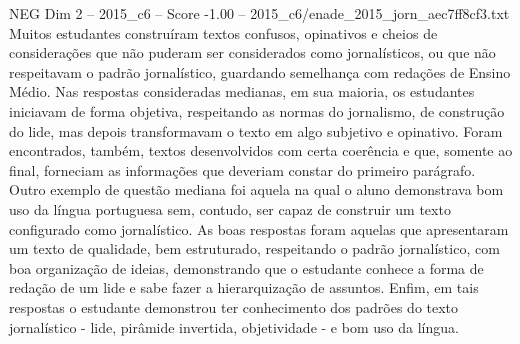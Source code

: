 \begin{textsample}{NEG Dim 2 – 2015\_c6 – Score -1.00 – 2015\_c6/enade\_2015\_jorn\_aec7ff8cf3.txt}
Muitos estudantes construíram textos confusos, opinativos e cheios de considerações que não puderam ser considerados como jornalísticos, ou que não respeitavam o padrão jornalístico, guardando semelhança com redações de Ensino Médio.
Nas respostas consideradas medianas, em sua maioria, os estudantes iniciavam de forma objetiva, respeitando as normas do jornalismo, de construção do lide, mas depois transformavam o texto em algo subjetivo e opinativo.
Foram encontrados, também, textos desenvolvidos com certa coerência e que, somente ao final, forneciam as informações que deveriam constar do primeiro parágrafo.
Outro exemplo de questão mediana foi aquela na qual o aluno demonstrava bom uso da língua portuguesa sem, contudo, ser capaz de construir um texto configurado como jornalístico.
As boas respostas foram aquelas que apresentaram um texto de qualidade, bem estruturado, respeitando o padrão jornalístico, com boa organização de ideias, demonstrando que o estudante conhece a forma de redação de um lide e sabe fazer a hierarquização de assuntos.
Enfim, em tais respostas o estudante demonstrou ter conhecimento dos padrões do texto jornalístico - lide, pirâmide invertida, objetividade - e bom uso da língua.

\end{textsample}
